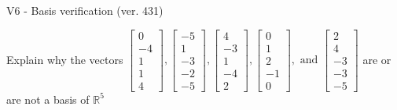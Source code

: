 \begin{exercise}
  \begin{exerciseTitle}V6 - Basis verification (ver. 431)\end{exerciseTitle}
  \begin{exerciseStatement}
    Explain why the vectors \(\left[\begin{array}{r}
0 \\
-4 \\
1 \\
1 \\
4
\end{array}\right] , \left[\begin{array}{r}
-5 \\
1 \\
-3 \\
-2 \\
-5
\end{array}\right] , \left[\begin{array}{r}
4 \\
-3 \\
1 \\
-4 \\
2
\end{array}\right] , \left[\begin{array}{r}
0 \\
1 \\
2 \\
-1 \\
0
\end{array}\right] , \text{ and } \left[\begin{array}{r}
2 \\
4 \\
-3 \\
-3 \\
-5
\end{array}\right]\) are or are not a basis of \(\mathbb{R}^5\)	



\end{exerciseStatement}
\end{exercise}
